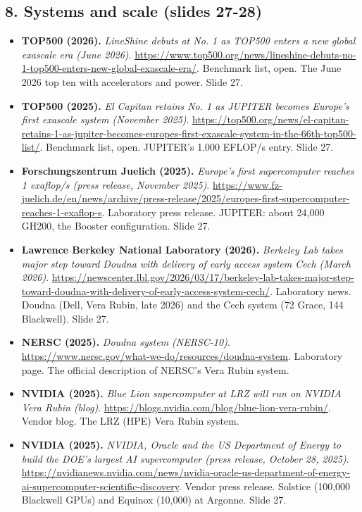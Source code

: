 \documentclass[11pt,letterpaper]{article}
\begin{document}
\subsection*{8. Systems and scale (slides 27-28)}
\begin{itemize}[leftmargin=1.2em,itemsep=3pt]\sloppy
\item \textbf{TOP500 (2026).} \textit{LineShine debuts at No. 1 as TOP500 enters a new global exascale era (June 2026)}. \url{https://www.top500.org/news/lineshine-debuts-no-1-top500-enters-new-global-exascale-era/}. Benchmark list, open. The June 2026 top ten with accelerators and power. Slide 27.
\item \textbf{TOP500 (2025).} \textit{El Capitan retains No. 1 as JUPITER becomes Europe's first exascale system (November 2025)}. \url{https://top500.org/news/el-capitan-retains-1-as-jupiter-becomes-europes-first-exascale-system-in-the-66th-top500-list/}. Benchmark list, open. JUPITER's 1.000 EFLOP/s entry. Slide 27.
\item \textbf{Forschungszentrum Juelich (2025).} \textit{Europe's first supercomputer reaches 1 exaflop/s (press release, November 2025)}. \url{https://www.fz-juelich.de/en/news/archive/press-release/2025/europes-first-supercomputer-reaches-1-exaflop-s}. Laboratory press release. JUPITER: about 24,000 GH200, the Booster configuration. Slide 27.
\item \textbf{Lawrence Berkeley National Laboratory (2026).} \textit{Berkeley Lab takes major step toward Doudna with delivery of early access system Cech (March 2026)}. \url{https://newscenter.lbl.gov/2026/03/17/berkeley-lab-takes-major-step-toward-doudna-with-delivery-of-early-access-system-cech/}. Laboratory news. Doudna (Dell, Vera Rubin, late 2026) and the Cech system (72 Grace, 144 Blackwell). Slide 27.
\item \textbf{NERSC (2025).} \textit{Doudna system (NERSC-10)}. \url{https://www.nersc.gov/what-we-do/resources/doudna-system}. Laboratory page. The official description of NERSC's Vera Rubin system.
\item \textbf{NVIDIA (2025).} \textit{Blue Lion supercomputer at LRZ will run on NVIDIA Vera Rubin (blog)}. \url{https://blogs.nvidia.com/blog/blue-lion-vera-rubin/}. Vendor blog. The LRZ (HPE) Vera Rubin system.
\item \textbf{NVIDIA (2025).} \textit{NVIDIA, Oracle and the US Department of Energy to build the DOE's largest AI supercomputer (press release, October 28, 2025)}. \url{https://nvidianews.nvidia.com/news/nvidia-oracle-us-department-of-energy-ai-supercomputer-scientific-discovery}. Vendor press release. Solstice (100,000 Blackwell GPUs) and Equinox (10,000) at Argonne. Slide 27.

\end{itemize}
\end{document}
